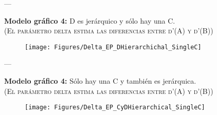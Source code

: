 \documentclass[a4paper ]{article}
\begin{document}
---
\vspace{3mm}
\begin{center}
{\LARGE \textbf{Modelo gráfico 4:} D es jerárquico y sólo hay una C.}\\
{\small \textsc{(El parámetro delta estima las diferencias entre d'(A) y d'(B))}}\\
\smallskip
\end{center}

\vspace{3mm}
\begin{figure}[th]
\centering
\texttt{[image: Figures/Delta\_EP\_DHierarchichal\_SingleC]}
\end{figure}
\clearpage





---
\vspace{3mm}
\begin{center}
{\LARGE \textbf{Modelo gráfico 4:} Sólo hay una C y también es jerárquica.}\\
{\small \textsc{(El parámetro delta estima las diferencias entre d'(A) y d'(B))}}\\
\smallskip
\end{center}

\vspace{3mm}
\begin{figure}[th]
\centering
\texttt{[image: Figures/Delta\_EP\_CyDHierarchical\_SingleC]}
\end{figure}
\clearpage
\end{document}
